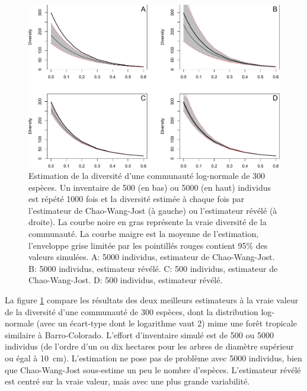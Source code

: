 \documentclass[
  11pt,
  french,
  a4paper,
  extrafontsizes,onecolumn,openright
  ]{memoir}
\begin{document}
\scriptsize

\begin{figure}

{\centering \includegraphics[width=1\linewidth]{images/Estimation} 

}

\caption{Estimation de la diversité d'une communauté log-normale de 300 espèces. Un inventaire de 500 (en bas) ou 5000 (en haut) individus est répété 1000 fois et la diversité estimée à chaque fois par l'estimateur de Chao-Wang-Jost (à gauche) ou l'estimateur révélé (à droite). La courbe noire en gras représente la vraie diversité de la communauté. La courbe maigre est la moyenne de l'estimation, l'enveloppe grise limitée par les pointillés rouges contient 95\% des valeurs simulées. A: 5000 individus, estimateur de Chao-Wang-Jost. B: 5000 individus, estimateur révélé. C: 500 individus, estimateur de Chao-Wang-Jost. D: 500 individus, estimateur révélé.}\label{fig:Estimation}
\end{figure}

\normalsize

La figure \ref{fig:Estimation} compare les résultats des deux meilleurs estimateurs à la vraie valeur de la diversité d'une communauté de 300 espèces, dont la distribution log-normale (avec un écart-type dont le logarithme vaut 2) mime une forêt tropicale similaire à Barro-Colorado.
L'effort d'inventaire simulé est de 500 ou 5000 individus (de l'ordre d'un ou dix hectares pour les arbres de diamètre supérieur ou égal à 10~cm).
L'estimation ne pose pas de problème avec 5000 individus, bien que Chao-Wang-Jost sous-estime un peu le nombre d'espèces.
L'estimateur révélé est centré sur la vraie valeur, mais avec une plus grande variabilité.
\end{document}
